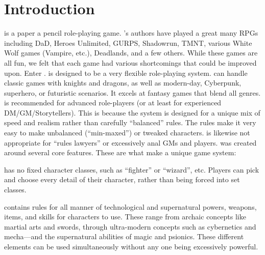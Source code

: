 \documentclass[twoside]{book}
\begin{document}
\section{Introduction}
    \APATHY{}  is a paper a pencil role-playing game.
            \APATHY{}’s authors have played a great many RPGs
            including DaD, Heroes Unlimited, GURPS, Shadowrun, TMNT,
            various White Wolf games (Vampire, etc.), Deadlands, and a
            few others. While these games are all fun, we felt that each
            game had various shortcomings that could be improved upon.
            Enter \APATHY{}. \APATHY{}  is designed to be a very
            flexible role-playing system. \APATHY{}  can handle classic
            games with knights and dragons, as well as modern-day,
            Cyberpunk, superhero, or futuristic scenarios. It excels at
            fantasy games that blend all genres.
          \APATHY{}  is recommended for advanced role-players (or
            at least for experienced DM/GM/Storytellers). This is because
            the \APATHY{}  system is designed for a unique mix of speed
            and realism rather than carefully “balanced”
            rules. The \APATHY{}  rules make it very easy to make
            unbalanced (“min-maxed”) or tweaked characters.
            \APATHY{}  is likewise not appropriate for “rules
            lawyers” or excessively anal GMs and players.
          \APATHY{}  was created around several core features.
            These are what make \APATHY{}  a unique game system:
            
              
               \APATHY{}  has no fixed character classes, such as
                “fighter” or “wizard”, etc.
                Players can pick and choose every detail of their
                character, rather than being forced into set classes.
                
              
              
               \APATHY{}  contains rules for all manner of
                technological and supernatural powers, weapons, items,
                and skills for characters to use. These range from
                archaic concepts like martial arts and swords, through
                ultra-modern concepts such as cybernetics and
                mecha—and the supernatural abilities of magic and
                psionics. These different elements can be used
                simultaneously without any one being excessively
                powerful.
                
              
              
\end{document}
